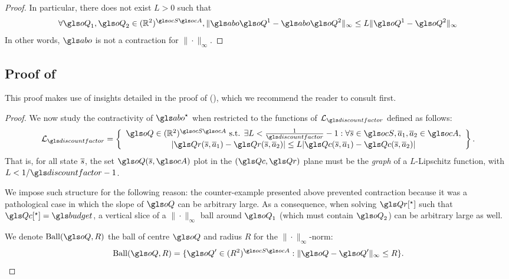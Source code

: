 \begin{subappendices}
\begin{proof}
	In particular, there does not exist $L>0$ such that
	$$\forall \oQ_1,\oQ_2\in(\Real^2)^{\ocS\ocA}, \|\abo \oQ^1 - \abo \oQ^2\|_\infty \leq L \|\oQ^1 - \oQ^2\|_\infty$$
	In other words, $\abo$ is not a contraction for $\|\cdot\|_\infty$.
\end{proof}

\subsection{Proof of }
\label{sec:contraction-with-smooth}

\begin{remark}
	\begin{leftbar}[remarkbar]
	This proof makes use of insights detailed in the proof of  (), which we recommend the reader to consult first.
	\end{leftbar}
\end{remark}

\begin{proof}
	We now study the contractivity of $\abo^{\star}$ when restricted to the functions of $\cL_{\discountfactor}$ defined as follows:
    \begin{equation}
    \cL_{\discountfactor} = \left\{\begin{array}{cc}
   \oQ\in(\Real^2)^{\ocS\ocA}\text{ s.t. }\exists L<\frac{1}{\discountfactor}-1: \forall \os\in\ocS,\oa_1,\oa_2\in\ocA,   \\
   |\Qr(\os,\oa_1) - \Qr(\os,\oa_2)| \leq L|\Qc(\os,\oa_1) - \Qc(\os,\oa_2)|
    \end{array}\right\}.
    \end{equation}
    That is, for all state $\overline{s}$, the set $\oQ(\os, \ocA)$ plot in the $(\Qc,\Qr)$ plane must be the \emph{graph} of a $L$-Lipschitz function, with $L<1/\discountfactor-1$.

    We impose such structure for the following reason: the counter-example presented above prevented contraction because it was a pathological case in which the slope of $\oQ$ can be arbitrary large. As a consequence, when solving $\Qr[^\star]$ such that $\Qc[^\star]=\budget$, a vertical slice of a $\|\cdot\|_\infty$ ball around $\oQ_1$ (which must contain $\oQ_2$) can be arbitrary large as well.


    We denote $\text{Ball}(\oQ,R)$ the ball of centre $\oQ$ and radius $R$ for the $\|\cdot\|_\infty$-norm:
    \begin{equation*}
        \text{Ball}(\oQ,R) = \{\oQ'\in(R^2)^{\ocS\ocA}: \|\oQ-\oQ'\|_\infty \leq R\}.
    \end{equation*}


\end{proof}
\end{subappendices}
